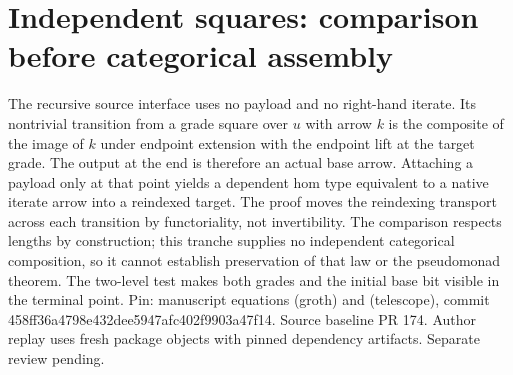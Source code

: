 \documentclass{article}
\begin{document}
\section*{Independent squares: comparison before categorical assembly}
The recursive source interface uses no payload and no right-hand iterate. Its nontrivial transition from a grade square over $u$ with arrow $k$ is the composite of the image of $k$ under endpoint extension with the endpoint lift at the target grade. The output at the end is therefore an actual base arrow. Attaching a payload only at that point yields a dependent hom type equivalent to a native iterate arrow into a reindexed target. The proof moves the reindexing transport across each transition by functoriality, not invertibility. The comparison respects lengths by construction; this tranche supplies no independent categorical composition, so it cannot establish preservation of that law or the pseudomonad theorem. The two-level test makes both grades and the initial base bit visible in the terminal point. Pin: manuscript equations (groth) and (telescope), commit 458ff36a4798e432dee5947afc402f9903a47f14. Source baseline PR 174. Author replay uses fresh package objects with pinned dependency artifacts. Separate review pending.
\end{document}
